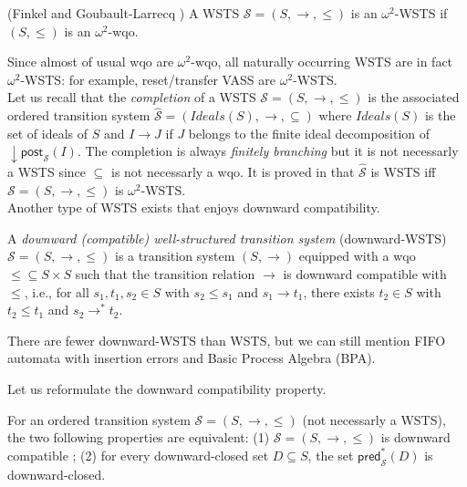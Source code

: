 \documentclass[runningheads]{llncs}
\newcommand{\pred}{\textsf{pred}}
\newcommand{\post}{\textsf{post}}
\begin{document}
\begin{definition}(Finkel and Goubault-Larrecq \cite{DBLP:journals/corr/abs-1208-4549})
A WSTS  $\mathscr{S}=(S, \rightarrow, \leq)$
is an $\omega^2$-WSTS if $(S, \leq)$ is an $\omega^2$-wqo.
\end{definition}
Since almost of usual wqo are $\omega^2$-wqo, all naturally occurring WSTS are in fact $\omega^2$-WSTS: for example, reset/transfer VASS are $\omega^2$-WSTS.\\

Let us recall that the \emph{completion}  \cite{BFM-ic17} of a WSTS $\mathscr{S}=(S,\rightarrow, \leq)$ is the associated ordered transition system $\hat{\mathscr{S}}=(Ideals(S),\rightarrow, \subseteq)$ where $Ideals(S)$ is the set of ideals of $S$ and $I \rightarrow J$ if $J$ belongs to the finite ideal decomposition of $\mathop{\downarrow} \post_{\mathscr{S}}(I)$. The completion is always \emph{finitely branching} but it is not necessarly a WSTS since $\subseteq$ is not necessarly a wqo. It is proved in  \cite{BFM-ic17} that $\hat{\mathscr{S}}$ is WSTS iff $\mathscr{S}=(S,\rightarrow, \leq)$ is $\omega^2$-WSTS. \\

Another type of WSTS exists that enjoys downward compatibility.
%
%
\begin{definition}
A {\em downward (compatible) well-structured transition system} (downward-WSTS)  $\mathscr{S}=(S, \rightarrow, \leq)$
is a transition system $(S, \rightarrow)$
equipped with a wqo ${\leq} \subseteq S \times S$ such that   
the transition relation $ \rightarrow$ is downward compatible with $\leq$, i.e., for all 
$s_1, t_1 , s_2 \in S$
	with $s_2 \leq s_1$  and $s_1 \rightarrow t_1$, there exists 
	$t_2 \in S$ with 
	$t_2 \leq t_1$ and $s_2 \rightarrow^{*} t_2$.
\end{definition}

There are fewer downward-WSTS than WSTS, but we can still mention FIFO automata with insertion errors and Basic Process Algebra (BPA).

Let us reformulate the downward compatibility property.

\begin{lemma}\label{downward compatible}
For an ordered transition system $\mathscr{S}=(S, \rightarrow, \leq)$ (not necessarly a WSTS), the two following properties are equivalent: (1) $\mathscr{S}=(S, \rightarrow, \leq)$ is downward compatible ; (2) for every downward-closed set $D \subseteq S$, the set $\pred_{\mathscr{S}}^*(D)$ is downward-closed.
\end{lemma}
\end{document}
